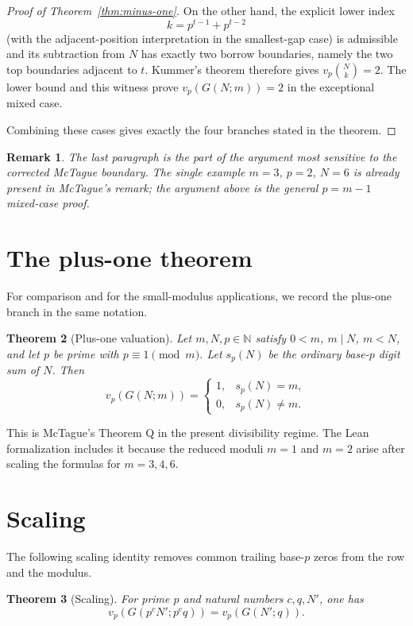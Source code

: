 \documentclass[11pt]{article}
\newtheorem{theorem}{Theorem}[section]
\newtheorem{remark}[theorem]{Remark}
\newcommand{\N}{\mathbb{N}}
\begin{document}
\begin{proof}[Proof of Theorem~\ref{thm:minus-one}]
On the other hand, the explicit lower index
\[
  k=p^{t-1}+p^{t-2}
\]
(with the adjacent-position interpretation in the smallest-gap case) is
admissible and its subtraction from $N$ has exactly two borrow boundaries,
namely the two top boundaries adjacent to $t$.  Kummer's theorem therefore gives
$v_p\binom Nk=2$.  The lower bound and this witness prove
$v_p(G(N;m))=2$ in the exceptional mixed case.

Combining these cases gives exactly the four branches stated in the theorem.
\end{proof}

\begin{remark}
The last paragraph is the part of the argument most sensitive to the corrected
McTague boundary.  The single example $m=3$, $p=2$, $N=6$ is already present in
McTague's remark; the argument above is the general $p=m-1$ mixed-case proof.
\end{remark}

\section{The plus-one theorem}\label{sec:plusone}

For comparison and for the small-modulus applications, we record the plus-one
branch in the same notation.

\begin{theorem}[Plus-one valuation]\label{thm:plus-one}
Let $m,N,p\in\N$ satisfy $0<m$, $m\mid N$, $m<N$, and let $p$ be prime with
$p\equiv 1\pmod m$.  Let $s_p(N)$ be the ordinary base-$p$ digit sum of $N$.
Then
\[
  v_p(G(N;m))=
  \begin{cases}
  1,& s_p(N)=m,\\
  0,& s_p(N)\ne m.
  \end{cases}
\]
\end{theorem}

This is McTague's Theorem Q in the present divisibility regime.  The Lean
formalization includes it because the reduced moduli $m=1$ and $m=2$ arise after
scaling the formulas for $m=3,4,6$.

\section{Scaling}\label{sec:scaling}

The following scaling identity removes common trailing base-$p$ zeros from the
row and the modulus.

\begin{theorem}[Scaling]\label{thm:scaling}
For prime $p$ and natural numbers $c,q,N'$, one has
\[
  v_p\left(G(p^cN';p^cq)\right)=v_p\left(G(N';q)\right).
\]
\end{theorem}
\end{document}
